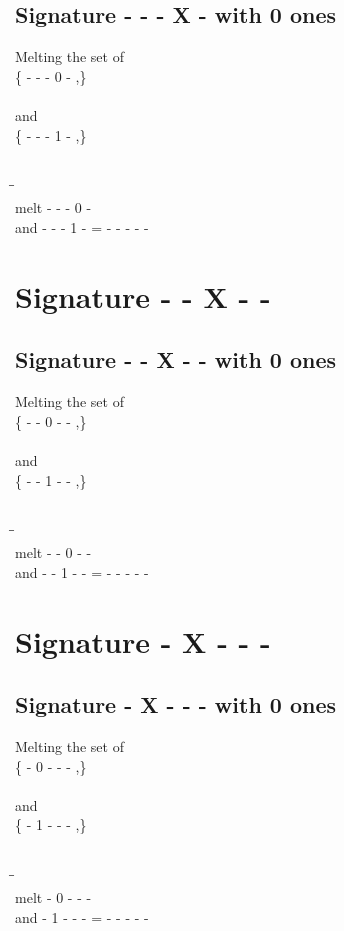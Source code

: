 \documentclass{article}
\begin{document}
\subsection{Signature - - - X - with 0 ones}
Melting the set of\\
\{ -  -  -  0  - ,\}\\\\
and\\
\{ -  -  -  1  - ,\}\\\\
\begin{tabbing}
\hspace{3cm}\=\hspace{3cm}\=\hspace{3cm}\\[1cm]
melt\> -  -  -  0  - \\
and\> -  -  -  1  - \>
 =  -  -  -  -  - \\[1mm]
\end{tabbing}
\newpage
\section{Signature - - X - - }
\subsection{Signature - - X - - with 0 ones}
Melting the set of\\
\{ -  -  0  -  - ,\}\\\\
and\\
\{ -  -  1  -  - ,\}\\\\
\begin{tabbing}
\hspace{3cm}\=\hspace{3cm}\=\hspace{3cm}\\[1cm]
melt\> -  -  0  -  - \\
and\> -  -  1  -  - \>
 =  -  -  -  -  - \\[1mm]
\end{tabbing}
\newpage
\section{Signature - X - - - }
\subsection{Signature - X - - - with 0 ones}
Melting the set of\\
\{ -  0  -  -  - ,\}\\\\
and\\
\{ -  1  -  -  - ,\}\\\\
\begin{tabbing}
\hspace{3cm}\=\hspace{3cm}\=\hspace{3cm}\\[1cm]
melt\> -  0  -  -  - \\
and\> -  1  -  -  - \>
 =  -  -  -  -  - \\[1mm]
\end{tabbing}
\newpage
\end{document}
